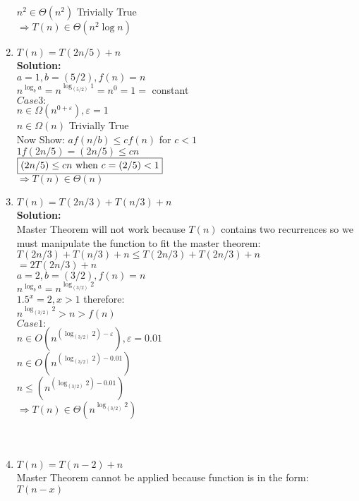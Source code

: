 \documentclass[12pt]{elsart}
\begin{document}
\begin{enumerate}
	$n^2 \in \Theta(n^2)$  Trivially True\\
	$\Rightarrow \boxed{T(n) \in \Theta (n^2\log n)}$\\
   \item   $T(n) = T(2n/5) + n$\\
	{\bf Solution:}\\
	$a=1, b=(5/2), f(n)=n$\\
	$n^{\log_b a}=n^{\log_{(5/2)} 1}=n^0=1=$ constant\\
	$Case 3:$\\
	$n \in \Omega (n^{0+\varepsilon}), \varepsilon = 1$\\
	$n \in \Omega (n)$ Trivially True\\
	Now Show: $af(n/b) \leq cf(n)$ for $c<1$\\
	$1f(2n/5) = (2n/5) \leq cn$\\
	$\boxed{(2n/5)\leq cn$ when $c=(2/5)<1}$\\
	$\Rightarrow \boxed{T(n) \in \Theta (n)}$\\
   \item   $T(n) = T(2n/3) + T(n/3) + n$\\
	{\bf Solution:}\\
	Master Theorem will not work because $T(n)$ contains two recurrences so we must manipulate the function to fit the master theorem:\\
	$T(2n/3)+T(n/3)+n \leq T(2n/3)+T(2n/3) +n$\\
	$=2T(2n/3)+n$\\
	$a=2, b=(3/2), f(n)=n$\\
	$n^{\log_b a}=n^{\log_{(3/2)} 2}$\\
	$1.5^x=2, x > 1$ therefore:\\
	$n^{\log_{(3/2)} 2} > n > f(n)$\\
	$Case 1:$\\
	$n \in O (n^{(\log_{(3/2)} 2) - \varepsilon}), \varepsilon = 0.01$\\
	$n \in O (n^{(\log_{(3/2)} 2) - 0.01})$\\
	$n \leq (n^{(\log_{(3/2)} 2) - 0.01})$\\
	$\Rightarrow \boxed{T(n) \in \Theta (n^{\log_{(3/2)} 2})}$\\\\\\
   \item   $T(n) = T(n-2) + n$\\
	Master Theorem cannot be applied because function is in the form:\\ $T(n-x)$\\\\

\end{enumerate}
\end{document}
